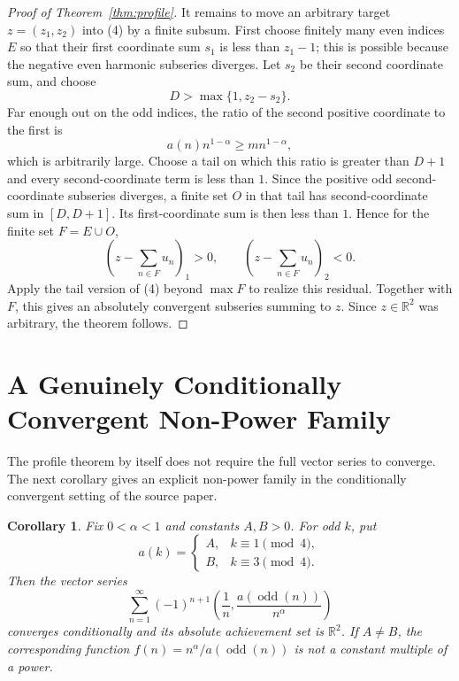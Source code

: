 \documentclass[11pt]{article}
\newtheorem{corollary}{Corollary}
\newcommand{\R}{\mathbb R}
\newcommand{\odd}{\operatorname{odd}}
\begin{document}
\begin{proof}[Proof of Theorem~\ref{thm:profile}]
It remains to move an arbitrary target $z=(z_1,z_2)$ into (4) by a finite
subsum.  First choose finitely many even indices $E$ so that their first
coordinate sum $s_1$ is less than $z_1-1$; this is possible because the
negative even harmonic subseries diverges.  Let $s_2$ be their second
coordinate sum, and choose
\[
  D>\max\{1,z_2-s_2\}.
\]
Far enough out on the odd indices, the ratio of the second positive
coordinate to the first is
\[
  a(n)n^{1-\alpha}\geq m n^{1-\alpha},
\]
which is arbitrarily large.  Choose a tail on which this ratio is greater
than $D+1$ and every second-coordinate term is less than $1$.  Since the
positive odd second-coordinate subseries diverges, a finite set $O$ in
that tail has second-coordinate sum in \([D,D+1]\).  Its first-coordinate
sum is then less than $1$.  Hence for the finite set $F=E\cup O$,
\[
  \left(z-\sum_{n\in F}u_n\right)_1>0,
  \qquad
  \left(z-\sum_{n\in F}u_n\right)_2<0.
\]
Apply the tail version of (4) beyond \(\max F\) to realize this residual.
Together with $F$, this gives an absolutely convergent subseries summing
to $z$.  Since $z\in\R^2$ was arbitrary, the theorem follows.
\end{proof}

\section*{A Genuinely Conditionally Convergent Non-Power Family}

The profile theorem by itself does not require the full vector series to
converge.  The next corollary gives an explicit non-power family in the
conditionally convergent setting of the source paper.

\begin{corollary}\label{cor:two-valued}
Fix $0<\alpha<1$ and constants $A,B>0$.  For odd $k$, put
\[
 a(k)=
 \begin{cases}
   A,&k\equiv1\pmod4,\\
   B,&k\equiv3\pmod4.
 \end{cases}
\]
Then the vector series
\[
 \sum_{n=1}^\infty(-1)^{n+1}
 \left(\frac1n,\frac{a(\odd(n))}{n^\alpha}\right)
\]
converges conditionally and its absolute achievement set is \(\R^2\).
If $A\neq B$, the corresponding function
\(f(n)=n^\alpha/a(\odd(n))\) is not a constant multiple of a power.
\end{corollary}
\end{document}
